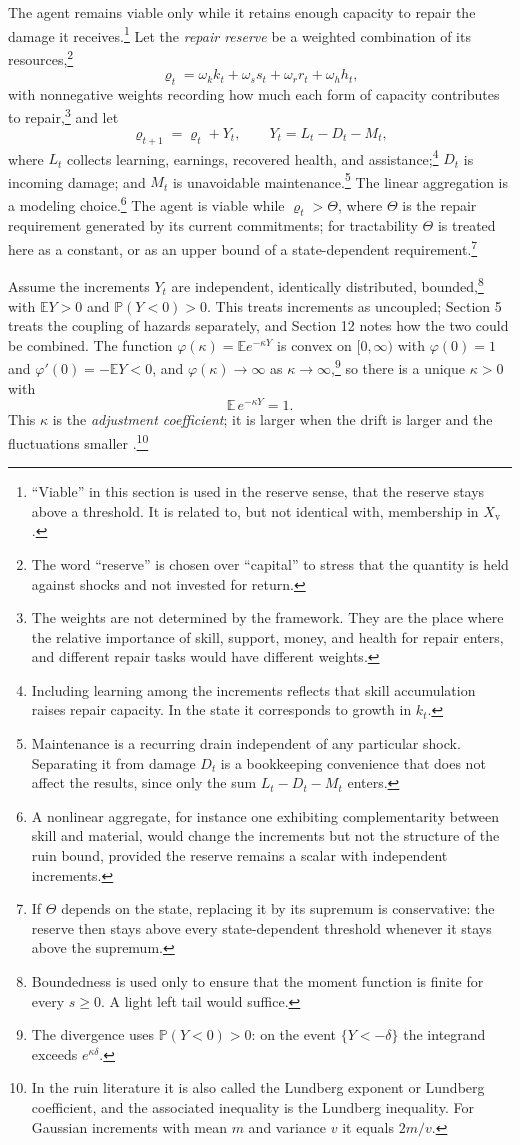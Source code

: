 \documentclass[11pt]{article}
\theoremstyle{remark}
\newcommand{\E}{\mathbb{E}}
\renewcommand{\Pr}{\mathbb{P}}
\newcommand{\Xv}{X_{\mathrm{v}}}
\begin{document}
The agent remains viable only while it retains enough capacity to repair the damage it receives.\footnote{``Viable'' in this section is used in the reserve sense, that the reserve stays above a threshold. It is related to, but not identical with, membership in $\Xv$.} Let the \emph{repair reserve} be a weighted combination of its resources,\footnote{The word ``reserve'' is chosen over ``capital'' to stress that the quantity is held against shocks and not invested for return.}
\[
\varrho_t=\omega_k k_t+\omega_s s_t+\omega_r r_t+\omega_h h_t,
\]
with nonnegative weights recording how much each form of capacity contributes to repair,\footnote{The weights are not determined by the framework. They are the place where the relative importance of skill, support, money, and health for repair enters, and different repair tasks would have different weights.} and let
\[
\varrho_{t+1}=\varrho_t+Y_t,\qquad Y_t=L_t-D_t-M_t,
\]
where $L_t$ collects learning, earnings, recovered health, and assistance;\footnote{Including learning among the increments reflects that skill accumulation raises repair capacity. In the state it corresponds to growth in $k_t$.} $D_t$ is incoming damage; and $M_t$ is unavoidable maintenance.\footnote{Maintenance is a recurring drain independent of any particular shock. Separating it from damage $D_t$ is a bookkeeping convenience that does not affect the results, since only the sum $L_t-D_t-M_t$ enters.} The linear aggregation is a modeling choice.\footnote{A nonlinear aggregate, for instance one exhibiting complementarity between skill and material, would change the increments but not the structure of the ruin bound, provided the reserve remains a scalar with independent increments.} The agent is viable while $\varrho_t>\Theta$, where $\Theta$ is the repair requirement generated by its current commitments; for tractability $\Theta$ is treated here as a constant, or as an upper bound of a state-dependent requirement.\footnote{If $\Theta$ depends on the state, replacing it by its supremum is conservative: the reserve then stays above every state-dependent threshold whenever it stays above the supremum.}

Assume the increments $Y_t$ are independent, identically distributed, bounded,\footnote{Boundedness is used only to ensure that the moment function is finite for every $s\ge0$. A light left tail would suffice.} with $\E Y>0$ and $\Pr(Y<0)>0$. This treats increments as uncoupled; Section 5 treats the coupling of hazards separately, and Section 12 notes how the two could be combined. The function $\varphi(\kappa)=\E e^{-\kappa Y}$ is convex on $[0,\infty)$ with $\varphi(0)=1$ and $\varphi'(0)=-\E Y<0$, and $\varphi(\kappa)\to\infty$ as $\kappa\to\infty$,\footnote{The divergence uses $\Pr(Y<0)>0$: on the event $\{Y<-\delta\}$ the integrand exceeds $e^{\kappa\delta}$.} so there is a unique $\kappa>0$ with
\[
\E\,e^{-\kappa Y}=1 .
\]
This $\kappa$ is the \emph{adjustment coefficient}; it is larger when the drift is larger and the fluctuations smaller \cite{asmussen}.\footnote{In the ruin literature it is also called the Lundberg exponent or Lundberg coefficient, and the associated inequality is the Lundberg inequality. For Gaussian increments with mean $m$ and variance $v$ it equals $2m/v$.}
\end{document}
